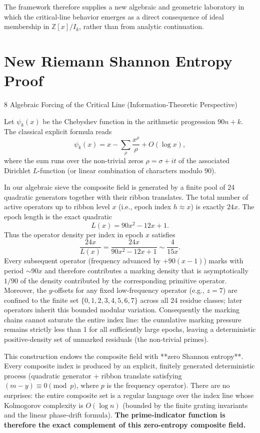 \documentclass[11pt,a4paper]{article}
\begin{document}
The framework therefore supplies a new algebraic and geometric laboratory in which the critical-line behavior emerges as a direct consequence of ideal membership in \(\mathbb{Z}[x]/I_k\), rather than from analytic continuation.


\section{New Riemann Shannon Entropy Proof}
8 Algebraic Forcing of the Critical Line (Information-Theoretic Perspective)

Let \(\psi_k(x)\) be the Chebyshev function in the arithmetic progression \(90n+k\). The classical explicit formula reads
\[
\psi_k(x) = x - \sum_{\rho} \frac{x^\rho}{\rho} + O(\log x),
\]
where the sum runs over the non-trivial zeros \(\rho=\sigma+it\) of the associated Dirichlet \(L\)-function (or linear combination of characters modulo 90).

In our algebraic sieve the composite field is generated by a finite pool of 24 quadratic generators together with their ribbon translates. The total number of active operators up to ribbon level \(x\) (i.e., epoch index \(h\approx x\)) is exactly \(24x\). The epoch length is the exact quadratic
\[
L(x)=90x^2-12x+1.
\]
Thus the operator density per index in epoch \(x\) satisfies
\[
\frac{24x}{L(x)}=\frac{24x}{90x^2-12x+1}\sim\frac{4}{15x}.
\]
Every subsequent operator (frequency advanced by \(+90(x-1)\)) marks with period \(\sim 90x\) and therefore contributes a marking density that is asymptotically \(1/90\) of the density contributed by the corresponding primitive operator. Moreover, the \(y\)-offsets for any fixed low-frequency operator (e.g., \(z=7\)) are confined to the finite set \(\{0,1,2,3,4,5,6,7\}\) across all 24 residue classes; later operators inherit this bounded modular variation. Consequently the marking chains cannot saturate the entire index line: the cumulative marking pressure remains strictly less than 1 for all sufficiently large epochs, leaving a deterministic positive-density set of unmarked residuals (the non-trivial primes).

This construction endows the composite field with **zero Shannon entropy**. Every composite index is produced by an explicit, finitely generated deterministic process (quadratic generator + ribbon translate satisfying \((m-y)\equiv0\pmod{p}\), where \(p\) is the frequency operator). There are no surprises: the entire composite set is a regular language over the index line whose Kolmogorov complexity is \(O(\log n)\) (bounded by the finite grating invariants and the linear phase-drift formula). \textbf{The prime-indicator function is therefore the exact complement of this zero-entropy composite field.}
\end{document}
